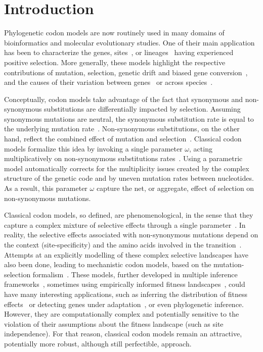\section{Introduction}

Phylogenetic codon models are now routinely used in many domains of bioinformatics and molecular evolutionary studies.
One of their main application has been to characterize the genes, sites~\citep{Nielsen1998}, or lineages~\citep{Zhang2004} having experienced positive selection.
More generally, these models highlight the respective contributions of mutation, selection, genetic drift and biased gene conversion~\citep{Kosiol2019}, and the causes of their variation between genes~\citep{Zhang2015} or across species~\citep{Lartillot2011}.

Conceptually, codon models take advantage of the fact that synonymous and non-synonymous substitutions are differentially impacted by selection.
Assuming synonymous mutations are neutral, the synonymous substitution rate is equal to the underlying mutation rate~\citep{kimura1983neutral}.
Non-synonymous substitutions, on the other hand, reflect the combined effect of mutation and selection~\citep{Ohta1995}.
Classical codon models formalize this idea by invoking a single parameter $\omega$, acting multiplicatively on non-synonymous substitutions rates~\citep{Muse1994, Goldman1994}.
Using a parametric model automatically corrects for the multiplicity issues created by the complex structure of the genetic code and by uneven mutation rates between nucleotides.
As a result, this parameter $\omega$ capture the net, or aggregate, effect of selection on non-synonymous mutations.

Classical codon models, so defined, are phenomenological, in the sense that they capture a complex mixture of selective effects through a single parameter~\citep{Rodrigue2010a}.
In reality, the selective effects associated with non-synonymous mutations depend on the context (site-specificity) and the amino acids involved in the transition~\citep{Kosiol2007}.
Attempts at an explicitly modelling of these complex selective landscapes have also been done, leading to mechanistic codon models, based on the mutation-selection formalism~\citep{Halpern1998}.
These models, further developed in multiple inference frameworks~\citep{Rodrigue2010, Tamuri2012}, sometimes using empirically informed fitness landscapes~\citep{Bloom2014}, could have many interesting applications, such as inferring the distribution of fitness effects~\citep{Tamuri2012} or detecting genes under adaptation~\citep{Rodrigue2016}, or even phylogenetic inference.
However, they are computationally complex and potentially sensitive to the violation of their assumptions about the fitness landscape (such as site independence).
For that reason, classical codon models remain an attractive, potentially more robust, although still perfectible, approach.

